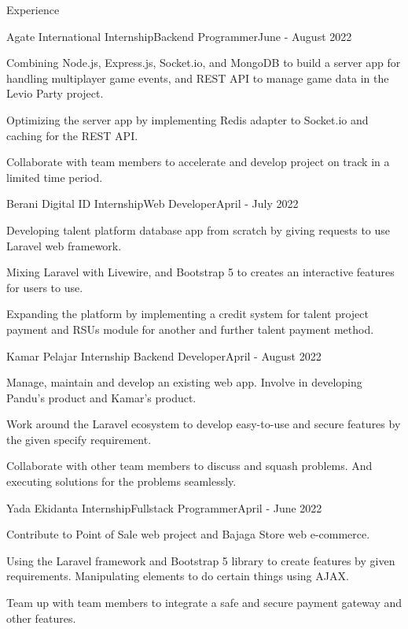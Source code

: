 \documentclass{article}
\newlength{\tabin}
\newlength{\secsep}
\newcommand{\lineunder}{\vspace*{-8pt} \\ \hspace*{-6pt} \hrulefill \\ \vspace*{-15pt}}
\newenvironment{tabbedsection}[1]{
  \begin{list}{}{
      \setlength{\itemsep}{0pt}
      \setlength{\labelsep}{0pt}
      \setlength{\labelwidth}{0pt}
      \setlength{\leftmargin}{\tabin}
      \setlength{\rightmargin}{\tabin}
      \setlength{\listparindent}{0pt}
      \setlength{\parsep}{0pt}
      \setlength{\parskip}{0pt}
      \setlength{\partopsep}{0pt}
      \setlength{\topsep}{#1}
    }
  \item[]
}{\end{list}}
\newenvironment{resume_section}[1]{
  \filbreak
  \vspace{2\secsep}
  \textsc{\large#1}
  \lineunder
  \begin{tabbedsection}{\secsep}
}{\end{tabbedsection}}
\newenvironment{subitems}{
  \renewcommand{\labelitemi}{-}
  \begin{itemize}
      \setlength{\labelsep}{1em}
}{\end{itemize}}
\newenvironment{resume_employer}[4]{
  \vspace{\secsep}
  \textbf{#1} \\ 
  \indent {\small #2} \hfill {\footnotesize#3 (#4)}
  \begin{tabbedsection}{0pt}
  \begin{subitems}
}{\end{subitems}\end{tabbedsection}}
\begin{document}
\begin{resume_section}{Experience}

  \begin{resume_employer}{Agate International Internship}{Backend Programmer}{}{June - August 2022}
    \item Combining Node.js, Express.js, Socket.io, and MongoDB to build a server app for handling multiplayer game events, and REST API to manage game data in the Levio Party project.
    \item Optimizing the server app by implementing Redis adapter to Socket.io and caching for the REST API.
    \item Collaborate with team members to accelerate and develop project on track in a limited time period.
  \end{resume_employer}

  \begin{resume_employer}{Berani Digital ID Internship}{Web Developer}{}{April - July 2022}
    \item Developing talent platform database app from scratch by giving requests to use Laravel web framework.
    \item Mixing Laravel with Livewire, and Bootstrap 5 to creates an interactive features for users to use.
    \item Expanding the platform by implementing a credit system for talent project payment and RSUs module for another and further talent payment method.
  \end{resume_employer}

  \begin{resume_employer}{Kamar Pelajar Internship}{
      Backend Developer}{}{April - August 2022}
    \item Manage, maintain and develop an existing web app. Involve in developing Pandu's product and Kamar's product.
    \item Work around the Laravel ecosystem to develop easy-to-use and secure features by the given specify requirement.
    \item Collaborate with other team members to discuss and squash problems. And executing solutions for the problems seamlessly.
  \end{resume_employer}

  \begin{resume_employer}{Yada Ekidanta Internship}{Fullstack Programmer}{}{April - June 2022}
    \item Contribute to Point of Sale web project and Bajaga Store web e-commerce.
    \item Using the Laravel framework and Bootstrap 5 library to create features by given requirements. Manipulating elements to do certain things using AJAX.
    \item Team up with team members to integrate a safe and secure payment gateway and other features.
  \end{resume_employer}

\end{resume_section}
\end{document}
